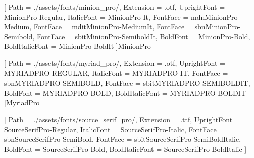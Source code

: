 
\graphicspath{{./assets/img}}



\newcommand{\ColorBox}[3]{\textcolor{#1}{\rule{#2}{#3}}}




\newfontfamily{\MinionPro}[
    Path           = {./assets/fonts/minion_pro/},
    Extension      = .otf,
    UprightFont    = {MinionPro-Regular},
    ItalicFont     = {MinionPro-It},
    FontFace       = {md}{n}{MinionPro-Medium},
    FontFace       = {md}{it}{MinionPro-MediumIt},
    FontFace       = {sb}{n}{MinionPro-Semibold},
    FontFace       = {sb}{it}{MinionPro-SemiboldIt},
    BoldFont       = {MinionPro-Bold},
    BoldItalicFont = {MinionPro-BoldIt}
]{MinionPro}

\newfontfamily{\MyriadPro}[
    Path           = {./assets/fonts/myriad_pro/},
    Extension      = .otf,
    UprightFont    = {MYRIADPRO-REGULAR},
    ItalicFont     = {MYRIADPRO-IT},
    FontFace       = {sb}{n}{MYRIADPRO-SEMIBOLD},
    FontFace       = {sb}{it}{MYRIADPRO-SEMIBOLDIT},
    BoldFont       = {MYRIADPRO-BOLD},
    BoldItalicFont = {MYRIADPRO-BOLDIT}
]{MyriadPro}

\setmainfont{SourceSerifPro}[
    Path           = {./assets/fonts/source_serif_pro/},
    Extension      = .ttf,
    UprightFont    = {SourceSerifPro-Regular},
    ItalicFont     = {SourceSerifPro-Italic},
    FontFace       = {sb}{n}{SourceSerifPro-SemiBold},
    FontFace       = {sb}{it}{SourceSerifPro-SemiBoldItalic},
    BoldFont       = {SourceSerifPro-Bold},
    BoldItalicFont = {SourceSerifPro-BoldItalic}
]

\newcommand{\FontVariant}[1]{\fontseries{#1}\selectfont}

\DeclareRobustCommand{\mddseries}{\FontVariant{md}}
\DeclareRobustCommand{\sbseries}{\FontVariant{sb}}
\DeclareTextFontCommand{\textmdd}{\mddseries}
\DeclareTextFontCommand{\textsb}{\sbseries}


\newcommand{\HRule}[1]{\rule{\linewidth}{#1}}